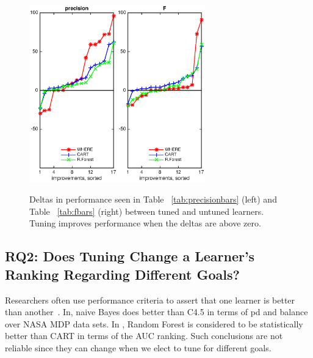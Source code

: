 \documentclass{sig-alternative}
\newcommand{\tab}[1]{Table ~\ref{tab:#1}}
\begin{document}
\begin{figure}[!t]
\begin{center}
\includegraphics[width=1.5in]{precision_W.eps}\includegraphics[width=1.5in]{F_W.eps}
 \end{center}
\caption{Deltas in performance  seen in \tab{precisionbars} (left)
and \tab{fbars} (right) between tuned and untuned learners. Tuning improves performance when the deltas are above zero.}\label{fig:deltas}
 \end{figure}

\subsection{RQ2:  Does Tuning Change a Learner's Ranking Regarding Different Goals?}\label{sect:rank}
Researchers often use performance criteria to assert that one learner is better than another~\cite{lessmann2008benchmarking,me07b}. In\cite{me07b}, naive Bayes does better than C4.5 in terms of pd and balance over NASA MDP data sets. In \cite{lessmann2008benchmarking}, Random Forest is considered to be statistically better than CART in terms of the AUC ranking. Such conclusions are not reliable since they can change when we elect to tune for different goals.
\end{document}
